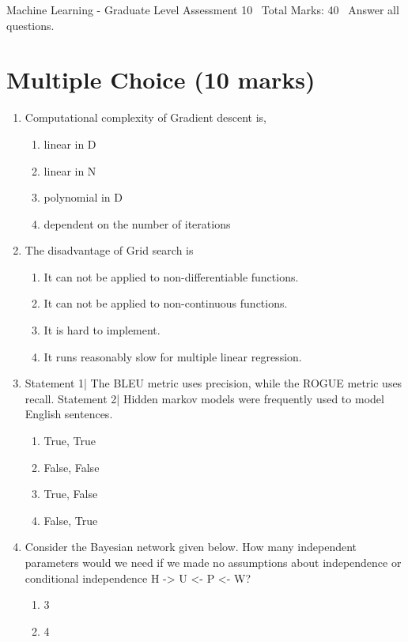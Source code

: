 \documentclass[12pt]{article}
\begin{document}
\begin{center}
Machine Learning - Graduate Level Assessment 10 \
Total Marks: 40 \
Answer all questions.
\end{center}

\section*{Multiple Choice (10 marks)}
\begin{enumerate}[label=\arabic*.]
\item Computational complexity of Gradient descent is,
\begin{enumerate}[label=(\alph*)]
    \item linear in D
    \item linear in N
    \item polynomial in D
    \item dependent on the number of iterations
\end{enumerate}
\item The disadvantage of Grid search is
\begin{enumerate}[label=(\alph*)]
    \item It can not be applied to non-differentiable functions.
    \item It can not be applied to non-continuous functions.
    \item It is hard to implement.
    \item It runs reasonably slow for multiple linear regression.
\end{enumerate}
\item Statement 1| The BLEU metric uses precision, while the ROGUE metric uses recall. Statement 2| Hidden markov models were frequently used to model English sentences.
\begin{enumerate}[label=(\alph*)]
    \item True, True
    \item False, False
    \item True, False
    \item False, True
\end{enumerate}
\item Consider the Bayesian network given below. How many independent parameters would we need if we made no assumptions about independence or conditional independence H -\textgreater{} U \textless{}- P \textless{}- W?
\begin{enumerate}[label=(\alph*)]
    \item 3
    \item 4

\end{enumerate}
\end{enumerate}
\end{document}
